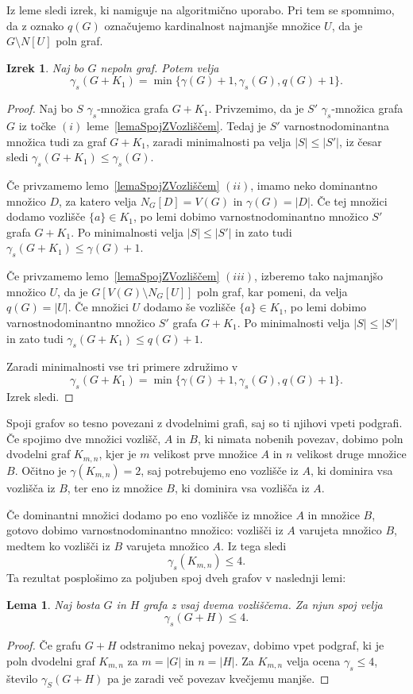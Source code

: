 \documentclass[12pt,a4paper,twoside]{article}
\theoremstyle{definition} %
\theoremstyle{plain} %
\newtheorem{lema}[definicija]{Lema}
\newtheorem{izrek}[definicija]{Izrek}
\numberwithin{equation}{section}  %
\begin{document}
Iz leme sledi izrek, ki namiguje na algoritmično uporabo. Pri tem se spomnimo, da z oznako $q(G)$ označujemo kardinalnost najmanjše množice $U$, da je $G \setminus N[U]$ poln graf.
\begin{izrek}\label{theorem3.5}{\rm{\cite[Corollary 2.10]{castillano2014secure}}}
Naj bo $G$ nepoln graf. Potem velja $$\gamma_s(G + K_1) = \min\{\gamma(G) + 1, \gamma_s(G), q(G) + 1\}.$$
\end{izrek}
\begin{proof}
Naj bo $S$ $\gamma_s$-množica grafa $G + K_1$. Privzemimo, da je $S'$ $\gamma_s$-množica grafa $G$ iz točke $(i)$ leme~\ref{lemaSpojZVozliščem}. Tedaj je $S'$ varnostnodominantna množica tudi za graf $G + K_1$, zaradi minimalnosti pa velja $|S| \leq |S'|$, iz česar sledi $\gamma_s(G + K_1) \leq \gamma_s(G)$. 

Če privzamemo lemo~\ref{lemaSpojZVozliščem} $(ii)$, imamo neko dominantno množico $D$, za katero velja $N_G[D] = V(G)$ in $\gamma(G) = |D|$. Če tej množici dodamo vozlišče $\{a\} \in K_1$, po lemi dobimo varnostnodominantno množico $S'$ grafa $G + K_1$. Po minimalnosti velja $|S| \leq |S'|$ in zato tudi $\gamma_s(G + K_1) \leq \gamma(G) + 1$.

Če privzamemo lemo~\ref{lemaSpojZVozliščem} $(iii)$, izberemo tako najmanjšo množico $U$, da je $G[V(G) \setminus N_G[U]]$ poln graf, kar pomeni, da velja $q(G) = |U|$. Če množici $U$ dodamo še vozlišče $\{a\} \in K_1$, po lemi dobimo varnostnodominantno množico $S'$ grafa $G + K_1$. Po minimalnosti velja $|S| \leq |S'|$ in zato tudi $\gamma_s(G + K_1) \leq q(G) + 1$.

\medskip
Zaradi minimalnosti vse tri primere združimo v $$\gamma_s(G + K_1) = \min\{\gamma(G) + 1, \gamma_s(G), q(G) + 1\}.$$
Izrek sledi.\end{proof}

Spoji grafov so tesno povezani z dvodelnimi grafi, saj so ti njihovi vpeti podgrafi. Če spojimo dve množici vozlišč, $A$ in $B$, ki nimata nobenih povezav, dobimo poln dvodelni graf $K_{m,n}$, kjer je $m$ velikost prve množice $A$ in $n$ velikost druge množice $B$. Očitno je $\gamma(K_{m,n}) = 2$, saj potrebujemo eno vozlišče iz $A$, ki dominira vsa vozlišča iz $B$, ter eno iz množice $B$, ki dominira vsa vozlišča iz $A$.


Če dominantni množici dodamo po eno vozlišče iz množice $A$ in množice $B$, gotovo dobimo varnostnodominantno množico: vozlišči iz $A$ varujeta množico $B$, medtem ko vozlišči iz $B$ varujeta množico $A$. Iz tega sledi
$$\gamma_s(K_{m,n}) \leq 4.$$
Ta rezultat posplošimo za poljuben spoj dveh grafov v naslednji lemi:
\begin{lema} \label{lemma3.6}
Naj bosta $G$ in $H$ grafa z vsaj dvema vozliščema. Za njun spoj velja $$\gamma_s(G + H) \leq 4.$$
\end{lema}
\begin{proof}
Če grafu $G + H$ odstranimo nekaj povezav, dobimo vpet podgraf, ki je poln dvodelni graf $K_{m,n}$ za $m = |G|$ in $n = |H|$. Za $K_{m,n}$ velja ocena $\gamma_s \leq 4$, število $\gamma_S(G + H)$ pa je zaradi več povezav kvečjemu manjše.\end{proof}
\end{document}
